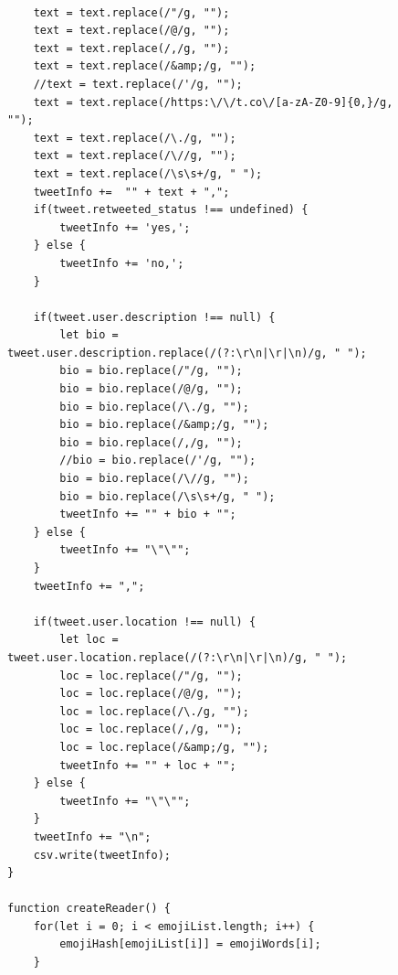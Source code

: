 \documentclass[prodmode]{acmsmall} %
\begin{document}
\begin{figure}[!t]
    \begin{lstlisting}

    text = text.replace(/"/g, "");
    text = text.replace(/@/g, "");
    text = text.replace(/,/g, "");
    text = text.replace(/&amp;/g, "");
    //text = text.replace(/'/g, "");
    text = text.replace(/https:\/\/t.co\/[a-zA-Z0-9]{0,}/g, "");
    text = text.replace(/\./g, "");
    text = text.replace(/\//g, "");
    text = text.replace(/\s\s+/g, " ");
    tweetInfo +=  "" + text + ",";
    if(tweet.retweeted_status !== undefined) {
        tweetInfo += 'yes,';
    } else {
        tweetInfo += 'no,';
    }

    if(tweet.user.description !== null) {
        let bio = tweet.user.description.replace(/(?:\r\n|\r|\n)/g, " ");
        bio = bio.replace(/"/g, "");
        bio = bio.replace(/@/g, "");
        bio = bio.replace(/\./g, "");
        bio = bio.replace(/&amp;/g, "");
        bio = bio.replace(/,/g, "");
        //bio = bio.replace(/'/g, "");
        bio = bio.replace(/\//g, "");
        bio = bio.replace(/\s\s+/g, " ");
        tweetInfo += "" + bio + "";
    } else {
        tweetInfo += "\"\"";
    }
    tweetInfo += ",";

    if(tweet.user.location !== null) {
        let loc = tweet.user.location.replace(/(?:\r\n|\r|\n)/g, " ");
        loc = loc.replace(/"/g, "");
        loc = loc.replace(/@/g, "");
        loc = loc.replace(/\./g, "");
        loc = loc.replace(/,/g, "");
        loc = loc.replace(/&amp;/g, "");
        tweetInfo += "" + loc + "";
    } else {
        tweetInfo += "\"\"";
    }
    tweetInfo += "\n";
    csv.write(tweetInfo);
}

function createReader() {
    for(let i = 0; i < emojiList.length; i++) {
        emojiHash[emojiList[i]] = emojiWords[i];
    }
    

\end{lstlisting}
  \end{figure}
\end{document}
